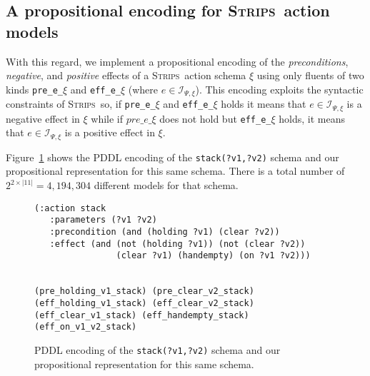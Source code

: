 \documentclass{article}
\newcommand{\strips}{\textsc{Strips}}
\begin{document}
\subsection{A propositional encoding for \strips\ action models}
With this regard, we implement a propositional encoding of the {\em preconditions}, {\em negative}, and {\em positive} effects of a \strips\ action schema $\xi$ using only fluents of two kinds {\tt\small pre\_e\_$\xi$} and {\tt\small eff\_e\_$\xi$} (where $e\in{\mathcal I}_{\Psi,\xi}$). This encoding exploits the syntactic constraints of \strips\ so, if {\tt\small pre\_e\_$\xi$} and {\tt\small eff\_e\_$\xi$} holds it means that $e\in{\mathcal I}_{\Psi,\xi}$ is a negative effect in $\xi$ while if $pre\_e\_\xi$ does not hold but {\tt\small eff\_e\_$\xi$} holds, it means that $e\in{\mathcal I}_{\Psi,\xi}$ is a positive effect in $\xi$.

Figure~\ref{fig:propositional} shows the PDDL encoding of the {\tt\small stack(?v1,?v2)} schema and our propositional representation for this same schema. There is a total number of $2^{2\times|11|}=4,194,304$ different models for that schema. 

\begin{figure}
  \begin{tiny}  
  \begin{verbatim}
(:action stack
   :parameters (?v1 ?v2)
   :precondition (and (holding ?v1) (clear ?v2))
   :effect (and (not (holding ?v1)) (not (clear ?v2))
                (clear ?v1) (handempty) (on ?v1 ?v2)))


(pre_holding_v1_stack) (pre_clear_v2_stack)
(eff_holding_v1_stack) (eff_clear_v2_stack)
(eff_clear_v1_stack) (eff_handempty_stack) (eff_on_v1_v2_stack)
  \end{verbatim}           
  \end{tiny}  
 \caption{\small PDDL encoding of the {\tt\small stack(?v1,?v2)} schema and our propositional representation for this same schema.}
\label{fig:propositional}
\end{figure}
\end{document}
